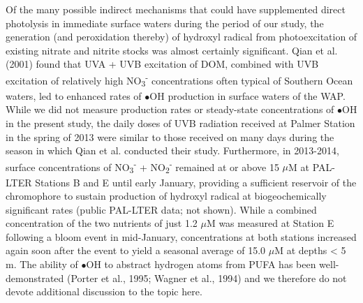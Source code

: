 Of the many possible indirect mechanisms that could have supplemented direct photolysis in immediate surface waters during the period of our study, the generation (and peroxidation thereby) of hydroxyl radical from photoexcitation of existing nitrate and nitrite stocks was almost certainly significant. Qian et al. (2001) found that UVA + UVB excitation of DOM, combined with UVB excitation of relatively high NO\textsubscript{3}\textsuperscript{-} concentrations often typical of Southern Ocean waters, led to enhanced rates of $\bullet$OH production in surface waters of the WAP. While we did not measure production rates or steady-state concentrations of $\bullet$OH in the present study, the daily doses of UVB radiation received at Palmer Station in the spring of 2013 were similar to those received on many days during the season in which Qian et al. conducted their study. Furthermore, in 2013-2014, surface concentrations of NO\textsubscript{3}\textsuperscript{-} + NO\textsubscript{2}\textsuperscript{-} remained at or above 15 $\mu$M at PAL-LTER Stations B and E until early January, providing a sufficient reservoir of the chromophore to sustain production of hydroxyl radical at biogeochemically significant rates (public PAL-LTER data; not shown). While a combined concentration of the two nutrients of just 1.2 $\mu$M was measured at Station E following a bloom event in mid-January, concentrations at both stations increased again soon after the event to yield a seasonal average of 15.0 $\mu$M at depths \textless{} 5 m. The ability of $\bullet$OH to abstract hydrogen atoms from PUFA has been well-demonstrated (Porter et al., 1995; Wagner et al., 1994) and we therefore do not devote additional discussion to the topic here.


